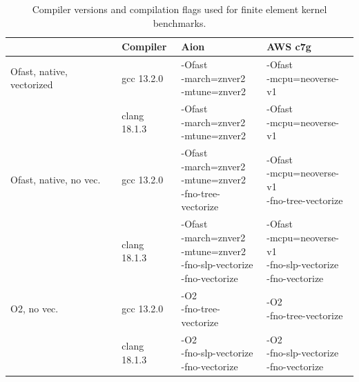 \begin{table}
    \centering
    \footnotesize
    \renewcommand{\arraystretch}{1.5}
    \begin{tabular}{l|l|l|l}
                                    & Compiler     & Aion                                                                                            & AWS c7g \\ \hline \hline
        Ofast, native, vectorized   & gcc 13.2.0   & \makecell[l]{-Ofast \\ -march=znver2 \\ -mtune=znver2}                                          & \makecell[l]{-Ofast \\ -mcpu=neoverse-v1} \\ \hline
                                    & clang 18.1.3 & \makecell[l]{-Ofast \\ -march=znver2 \\ -mtune=znver2}                                          & \makecell[l]{-Ofast \\ -mcpu=neoverse-v1} \\ \hline
        Ofast, native, no vec.      & gcc 13.2.0   & \makecell[l]{-Ofast \\ -march=znver2 \\ -mtune=znver2 \\ -fno-tree-vectorize}                   & \makecell[l]{-Ofast \\ -mcpu=neoverse-v1 \\ -fno-tree-vectorize} \\ \hline
                                    & clang 18.1.3 & \makecell[l]{-Ofast \\ -march=znver2 \\ -mtune=znver2 \\ -fno-slp-vectorize \\ -fno-vectorize}  & \makecell[l]{-Ofast \\ -mcpu=neoverse-v1 \\ -fno-slp-vectorize \\ -fno-vectorize} \\ \hline
        O2, no vec.                 & gcc 13.2.0   & \makecell[l]{-O2 \\ -fno-tree-vectorize}                                                        & \makecell[l]{-O2 \\ -fno-tree-vectorize} \\ \hline
                                    & clang 18.1.3 & \makecell[l]{-O2 \\ -fno-slp-vectorize \\ -fno-vectorize}                                       & \makecell[l]{-O2 \\ -fno-slp-vectorize \\ -fno-vectorize} \\ \hline
    \end{tabular}
    \vspace{5pt}
    \caption{Compiler versions and compilation flags used for finite element kernel benchmarks.}
    \label{tab:compilers-kernels}
\end{table}

